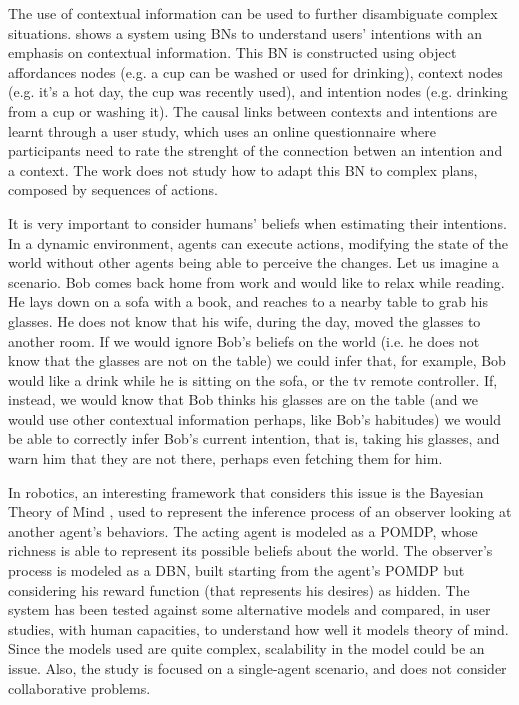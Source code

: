 The use of contextual information can be used to further disambiguate complex situations. \cite{Liu2014} shows a system using BNs to understand users' intentions with an emphasis on contextual information. This BN is constructed using object affordances nodes (e.g. a cup can be washed or used for drinking), context nodes (e.g. it's a hot day, the cup was recently used), and intention nodes (e.g. drinking from a cup or washing it). The causal links between contexts and intentions are learnt through a user study, which uses an online questionnaire where participants need to rate the strenght of the connection betwen an intention and a context. The work does not study how to adapt this BN to complex plans, composed by sequences of actions.

It is very important to consider humans' beliefs when estimating their intentions. In a dynamic environment, agents can execute actions, modifying the state of the world without other agents being able to perceive the changes. Let us imagine a scenario. Bob comes back home from work and would like to relax while reading. He lays down on a sofa with a book, and reaches to a nearby table to grab his glasses. He does not know that his wife, during the day, moved the glasses to another room. If we would ignore Bob's beliefs on the world (i.e. he does not know that the glasses are not on the table) we could infer that, for example, Bob would like a drink while he is sitting on the sofa, or the tv remote controller. If, instead, we would know that Bob thinks his glasses are on the table (and we would use other contextual information perhaps, like Bob's habitudes) we would be able to correctly infer Bob's current intention, that is, taking his glasses, and warn him that they are not there, perhaps even fetching them for him. 

In robotics, an interesting framework that considers this issue is the Bayesian Theory of Mind \cite{baker2014modeling}, used to represent the inference process of an observer looking at another agent's behaviors. The acting agent is modeled as a POMDP, whose richness is able to represent its possible beliefs about the world. The observer's process is modeled as a DBN, built starting from the agent's POMDP but considering his reward function (that represents his desires) as hidden. The system has been tested against some alternative models and compared, in user studies, with human capacities, to understand how well it models theory of mind. Since the models used are quite complex, scalability in the model could be an issue. Also, the study is focused on a single-agent scenario, and does not consider collaborative problems.

